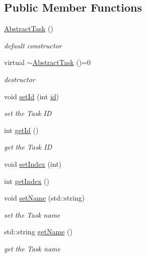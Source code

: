 \subsection*{Public Member Functions}
\begin{DoxyCompactItemize}
\item 
\hyperlink{class_do_lah_1_1_abstract_task_ae2a97fef4144783a29066808f0fa5b52}{Abstract\+Task} ()
\begin{DoxyCompactList}\small\item\em default constructor \end{DoxyCompactList}\item 
virtual \hyperlink{class_do_lah_1_1_abstract_task_a2c6d75a44dfba478d8a31ad4a3fec339}{$\sim$\+Abstract\+Task} ()=0
\begin{DoxyCompactList}\small\item\em destructor \end{DoxyCompactList}\item 
void \hyperlink{class_do_lah_1_1_abstract_task_a4647ce88273add6435a14215a9ce1a58}{set\+Id} (int \hyperlink{class_do_lah_1_1_abstract_task_a2ad7d227c4ab1ac0768a7633419f0934}{id})
\begin{DoxyCompactList}\small\item\em set the Task I\+D \end{DoxyCompactList}\item 
int \hyperlink{class_do_lah_1_1_abstract_task_af90dffe6985e8df0827b861c048867cb}{get\+Id} ()
\begin{DoxyCompactList}\small\item\em get the Task I\+D \end{DoxyCompactList}\item 
void \hyperlink{class_do_lah_1_1_abstract_task_ac6ff5bbb5435d6e4f9cf42f0aa50e16b}{set\+Index} (int)
\item 
int \hyperlink{class_do_lah_1_1_abstract_task_ae0a89118e62013e3e007d7541bf7311f}{get\+Index} ()
\item 
void \hyperlink{class_do_lah_1_1_abstract_task_ae3e1d1fd3cc09b0138e435604c61a437}{set\+Name} (std\+::string)
\begin{DoxyCompactList}\small\item\em set the Task name \end{DoxyCompactList}\item 
std\+::string \hyperlink{class_do_lah_1_1_abstract_task_acd3b530c15e995d71b08ab9aae6c96a2}{get\+Name} ()
\begin{DoxyCompactList}\small\item\em get the Task name \end{DoxyCompactList}\item 

\end{DoxyCompactItemize}

